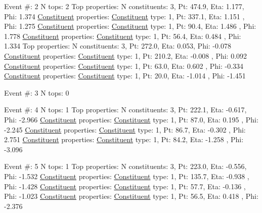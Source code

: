 \begin{DoxyCode}
Event #: 2
      N tops: 2
      Top properties: N constituents:   3,   Pt:  474.9,   Eta:   1.177,   Phi:   1.374
          \hyperlink{classConstituent}{Constituent} properties: \hyperlink{classConstituent}{Constituent} type:   1,   Pt:  337.1,   Eta:   1.151
      ,   Phi:   1.275
          \hyperlink{classConstituent}{Constituent} properties: \hyperlink{classConstituent}{Constituent} type:   1,   Pt:   90.4,   Eta:   1.486
      ,   Phi:   1.778
          \hyperlink{classConstituent}{Constituent} properties: \hyperlink{classConstituent}{Constituent} type:   1,   Pt:   56.4,   Eta:   0.484
      ,   Phi:   1.334
      Top properties: N constituents:   3,   Pt:  272.0,   Eta:   0.053,   Phi:  -0.078
          \hyperlink{classConstituent}{Constituent} properties: \hyperlink{classConstituent}{Constituent} type:   1,   Pt:  210.2,   Eta:  -0.008
      ,   Phi:   0.092
          \hyperlink{classConstituent}{Constituent} properties: \hyperlink{classConstituent}{Constituent} type:   1,   Pt:   63.0,   Eta:   0.602
      ,   Phi:  -0.334
          \hyperlink{classConstituent}{Constituent} properties: \hyperlink{classConstituent}{Constituent} type:   1,   Pt:   20.0,   Eta:  -1.014
      ,   Phi:  -1.451

Event #: 3
      N tops: 0

Event #: 4
      N tops: 1
      Top properties: N constituents:   3,   Pt:  222.1,   Eta:  -0.617,   Phi:  -2.966
          \hyperlink{classConstituent}{Constituent} properties: \hyperlink{classConstituent}{Constituent} type:   1,   Pt:   87.0,   Eta:   0.195
      ,   Phi:  -2.245
          \hyperlink{classConstituent}{Constituent} properties: \hyperlink{classConstituent}{Constituent} type:   1,   Pt:   86.7,   Eta:  -0.302
      ,   Phi:   2.751
          \hyperlink{classConstituent}{Constituent} properties: \hyperlink{classConstituent}{Constituent} type:   1,   Pt:   84.2,   Eta:  -1.258
      ,   Phi:  -3.096

Event #: 5
      N tops: 1
      Top properties: N constituents:   3,   Pt:  223.0,   Eta:  -0.556,   Phi:  -1.532
          \hyperlink{classConstituent}{Constituent} properties: \hyperlink{classConstituent}{Constituent} type:   1,   Pt:  135.7,   Eta:  -0.938
      ,   Phi:  -1.428
          \hyperlink{classConstituent}{Constituent} properties: \hyperlink{classConstituent}{Constituent} type:   1,   Pt:   57.7,   Eta:  -0.136
      ,   Phi:  -1.023
          \hyperlink{classConstituent}{Constituent} properties: \hyperlink{classConstituent}{Constituent} type:   1,   Pt:   56.5,   Eta:   0.418
      ,   Phi:  -2.376


\end{DoxyCode}
